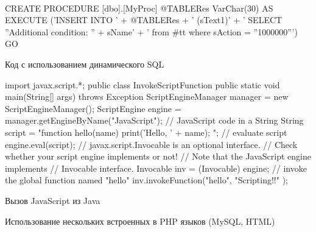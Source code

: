 \

\begin{listing}
    \begin{pyglist}[language=sql,numbers=left,numbersep=5pt]

CREATE PROCEDURE [dbo].[MyProc]  @TABLERes   VarChar(30)
AS
    EXECUTE ('INSERT INTO ' + @TABLERes + ' (sText1)' +
             ' SELECT ''Additional condition: '' + sName' +
             ' from #tt where sAction = ''1000000''')
GO
    \end{pyglist}
\caption{Код с использованием динамического SQL}
\label{lst:dsql1}
\end{listing} 
 
\begin{listing}
    \begin{pyglist}[language=java,numbers=left,numbersep=5pt]
import javax.script.*;  
public class InvokeScriptFunction {  
    public static void main(String[] args) throws Exception {  
        ScriptEngineManager manager = new ScriptEngineManager();  
        ScriptEngine engine = manager.getEngineByName("JavaScript");  
        // JavaScript code in a String  
        String script = 
            "function hello(name) { print('Hello, ' + name); }";  
        // evaluate script  
        engine.eval(script);  
        // javax.script.Invocable is an optional interface.  
        // Check whether your script engine implements or not!  
        // Note that the JavaScript engine implements
        // Invocable interface.  
        Invocable inv = (Invocable) engine;  
        // invoke the global function named "hello"  
        inv.invokeFunction("hello", "Scripting!!" );  
    }  
}
    \end{pyglist}
\caption{Вызов JavaScript из Java}
\label{lst:JsJava}
\end{listing}


\begin{listing}
\caption{Использование нескольких встроенных в PHP языков (MySQL, HTML)}
\label{lst:PhPSqlHtml}
\end{listing}



